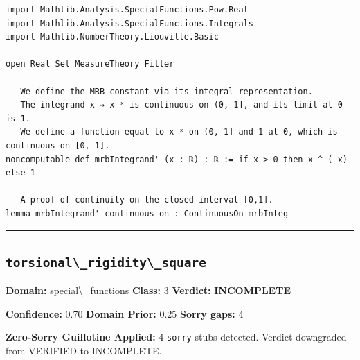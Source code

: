 \documentclass[12pt,a4paper]{article}
\begin{document}
\begin{lstlisting}[caption={Lean 4 Sketch (v14 Galois)}]
import Mathlib.Analysis.SpecialFunctions.Pow.Real
import Mathlib.Analysis.SpecialFunctions.Integrals
import Mathlib.NumberTheory.Liouville.Basic

open Real Set MeasureTheory Filter

-- We define the MRB constant via its integral representation.
-- The integrand x ↦ x⁻ˣ is continuous on (0, 1], and its limit at 0 is 1.
-- We define a function equal to x⁻ˣ on (0, 1] and 1 at 0, which is continuous on [0, 1].
noncomputable def mrbIntegrand' (x : ℝ) : ℝ := if x > 0 then x ^ (-x) else 1

-- A proof of continuity on the closed interval [0,1].
lemma mrbIntegrand'_continuous_on : ContinuousOn mrbInteg
\end{lstlisting}

\hrule\medskip

\subsection*{\texttt{torsional\textbackslash{}_rigidity\textbackslash{}_square}}

\textbf{Domain:} special\textbackslash{}_functions \quad \textbf{Class:} 3 \quad \textbf{Verdict:} \textcolor{incompleteamber}{\textbf{INCOMPLETE}}

\textbf{Confidence:} 0.70 \quad \textbf{Domain Prior:} 0.25 \quad \textbf{Sorry gaps:} 4

\textcolor{sorryred}{\textbf{Zero-Sorry Guillotine Applied:} 4 \texttt{sorry} stubs detected. Verdict downgraded from VERIFIED to INCOMPLETE.}
\end{document}
